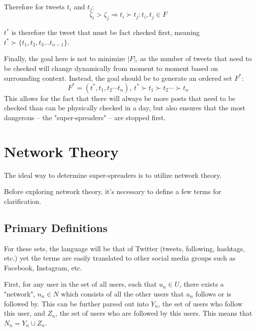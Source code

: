 \documentclass[preprint,review,12pt]{elsarticle}
\begin{document}
 Therefore for tweets $t_i$ and $t_j$: 
  \begin{equation}
      \zeta_i > \zeta_j \Rightarrow t_i \succ t_j : t_i, t_j \in F
  \end{equation}
  
  $t^*$ is therefore the tweet that must be fact checked first, meaning  $t^* \succ \{t_1, t_2, t_3 ... t_{n-1}\}$. 
  
  Finally, the goal here is not to minimize $|F|$, as the number of tweets that need to be checked will change dynamically from moment to moment based on surrounding context. Instead, the goal should be to generate an ordered set $F^*$:
  \begin{equation}
      F^* = (t^*, t_1, t_2 \cdots t_n), \ t^* \succ t_1 \succ t_2 \cdots \succ t_n
  \end{equation}
  This allows for the fact that there will always be more posts that need to be checked than can be physically checked in a day, but also ensures that the most dangerous -- the "super-spreaders" -- are stopped first.

\section{Network Theory}
The ideal way to determine super-spreaders is to utilize network theory.

Before exploring network theory, it's necessary to define a few terms for clarification.

\subsection{Primary Definitions}
\label{Primarysets}
For these sets, the language will be that of Twitter (tweets, following, hashtags, etc.) yet the terms are easily translated to other social media groups such as Facebook, Instagram, etc.

First, for any user in the set of all users, such that $u_n \in U$, there exists a "network", $n_n \in N$ which consists of all the other users that $u_n$ follows or is followed by. This can be further parsed out into $Y_n$, the set of users who follow this user, and $Z_n$, the set of users who are followed by this users. This means that  $N_n = Y_n \cup Z_n$. 
\end{document}

